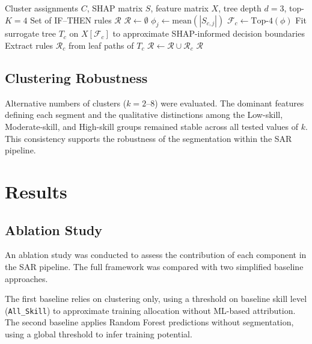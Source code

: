 \documentclass[3p,twocolumn,authoryear]{elsarticle}
\begin{document}
\begin{algorithm}
\caption{SHAP-guided Surrogate Rule Extraction}
\label{alg:rules}
\begin{algorithmic}[1]
\Require Cluster assignments $C$, SHAP matrix $S$, feature matrix $X$,
         tree depth $d = 3$, top-$K = 4$
\Ensure Set of IF--THEN rules $\mathcal{R}$
\State $\mathcal{R} \gets \emptyset$
  \State $\phi_j \gets \text{mean}(|S_{c,j}|)$
  \State $\mathcal{F}_c \gets \text{Top-}4(\phi)$
  \State Fit surrogate tree $T_c$ on $X[\mathcal{F}_c]$
         to approximate SHAP-informed decision boundaries
  \State Extract rules $\mathcal{R}_c$ from leaf paths of $T_c$
  \State $\mathcal{R} \gets \mathcal{R} \cup \mathcal{R}_c$
\EndFor
\State \Return $\mathcal{R}$
\end{algorithmic}
\end{algorithm}

\subsection{Clustering Robustness}

Alternative numbers of clusters ($k = 2$–$8$) were evaluated.
The dominant features defining each segment and the qualitative
distinctions among the Low-skill, Moderate-skill, and High-skill groups
remained stable across all tested values of $k$.
This consistency supports the robustness of the segmentation within the
SAR pipeline.

\section{Results}

\subsection{Ablation Study}

An ablation study was conducted to assess the contribution of each
component in the SAR pipeline.
The full framework was compared with two simplified baseline approaches.

The first baseline relies on clustering only, using a threshold on
baseline skill level (\texttt{All\_Skill}) to approximate training
allocation without ML-based attribution.
The second baseline applies Random Forest predictions without
segmentation, using a global threshold to infer training potential.
\end{document}
